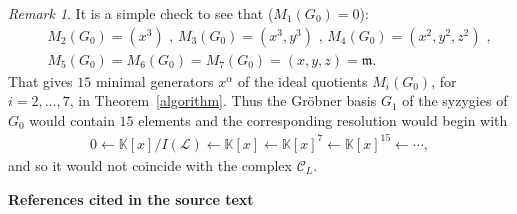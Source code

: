 \documentclass[10pt]{amsart}
\newcommand{\mbk}{\mbox{$\mathbb{K}$}}
\newcommand{\mcc}{\mbox{$\mathcal{C}$}}
\newcommand{\mcl}{\mbox{$\mathcal{L}$}}
\newcommand{\mfm}{\mbox{$\mathfrak{m}$}}
\theoremstyle{definition}
\theoremstyle{remark}
\newtheorem{remark}[cdrthm]{Remark}
\begin{document}
\begin{remark}
It is a simple check to see that ($M_1(G_0)=0$):
\begin{eqnarray*}
&&M_2(G_0)=(x^3)\mbox{ , }
M_3(G_0)=(x^3,y^3)\mbox{ , }
M_4(G_0)=(x^2,y^2,z^2)\mbox{ , }\\
&&M_5(G_0)=M_6(G_0)=M_7(G_0)=(x,y,z)=\mfm.
\end{eqnarray*}
That gives $15$ minimal generators $x^\alpha$ of the ideal quotients
$M_i(G_0)$, for $i=2,\ldots ,7$, in Theorem~\ref{algorithm}.  Thus the
Gr\"obner basis $G_1$ of the syzygies of $G_0$ would contain $15$
elements and the corresponding resolution would begin with
\begin{eqnarray*}
0\leftarrow \mbk[x]/I(\mcl)\leftarrow
\mbk[x]\leftarrow\mbk[x]^{7}\leftarrow \mbk[x]^{15}\leftarrow\cdots ,
\end{eqnarray*}
and so it would not coincide with the complex $\mcc_{L}$.
\end{remark}
\vspace{1em}
\noindent\textbf{References cited in the source text}\par
\end{document}
